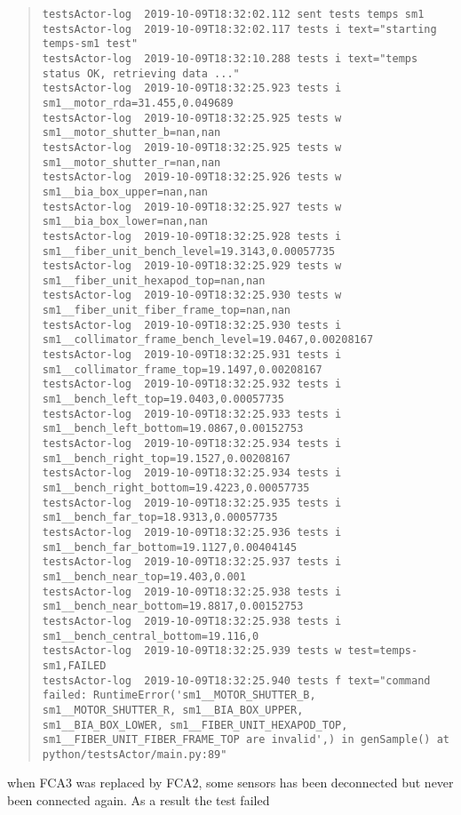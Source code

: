 \begin{quote}
\begin{tiny}
\begin{verbatim}
testsActor-log  2019-10-09T18:32:02.112 sent tests temps sm1
testsActor-log  2019-10-09T18:32:02.117 tests i text="starting temps-sm1 test"
testsActor-log  2019-10-09T18:32:10.288 tests i text="temps status OK, retrieving data ..."
testsActor-log  2019-10-09T18:32:25.923 tests i sm1__motor_rda=31.455,0.049689
testsActor-log  2019-10-09T18:32:25.925 tests w sm1__motor_shutter_b=nan,nan
testsActor-log  2019-10-09T18:32:25.925 tests w sm1__motor_shutter_r=nan,nan
testsActor-log  2019-10-09T18:32:25.926 tests w sm1__bia_box_upper=nan,nan
testsActor-log  2019-10-09T18:32:25.927 tests w sm1__bia_box_lower=nan,nan
testsActor-log  2019-10-09T18:32:25.928 tests i sm1__fiber_unit_bench_level=19.3143,0.00057735
testsActor-log  2019-10-09T18:32:25.929 tests w sm1__fiber_unit_hexapod_top=nan,nan
testsActor-log  2019-10-09T18:32:25.930 tests w sm1__fiber_unit_fiber_frame_top=nan,nan
testsActor-log  2019-10-09T18:32:25.930 tests i sm1__collimator_frame_bench_level=19.0467,0.00208167
testsActor-log  2019-10-09T18:32:25.931 tests i sm1__collimator_frame_top=19.1497,0.00208167
testsActor-log  2019-10-09T18:32:25.932 tests i sm1__bench_left_top=19.0403,0.00057735
testsActor-log  2019-10-09T18:32:25.933 tests i sm1__bench_left_bottom=19.0867,0.00152753
testsActor-log  2019-10-09T18:32:25.934 tests i sm1__bench_right_top=19.1527,0.00208167
testsActor-log  2019-10-09T18:32:25.934 tests i sm1__bench_right_bottom=19.4223,0.00057735
testsActor-log  2019-10-09T18:32:25.935 tests i sm1__bench_far_top=18.9313,0.00057735
testsActor-log  2019-10-09T18:32:25.936 tests i sm1__bench_far_bottom=19.1127,0.00404145
testsActor-log  2019-10-09T18:32:25.937 tests i sm1__bench_near_top=19.403,0.001
testsActor-log  2019-10-09T18:32:25.938 tests i sm1__bench_near_bottom=19.8817,0.00152753
testsActor-log  2019-10-09T18:32:25.938 tests i sm1__bench_central_bottom=19.116,0
testsActor-log  2019-10-09T18:32:25.939 tests w test=temps-sm1,FAILED
testsActor-log  2019-10-09T18:32:25.940 tests f text="command failed: RuntimeError('sm1__MOTOR_SHUTTER_B, sm1__MOTOR_SHUTTER_R, sm1__BIA_BOX_UPPER,
sm1__BIA_BOX_LOWER, sm1__FIBER_UNIT_HEXAPOD_TOP, sm1__FIBER_UNIT_FIBER_FRAME_TOP are invalid',) in genSample() at python/testsActor/main.py:89"
\end{verbatim}
\end{tiny}
\end{quote}

\noindent when FCA3 was replaced by FCA2, some sensors has been deconnected but never been connected again. As a result the test failed

